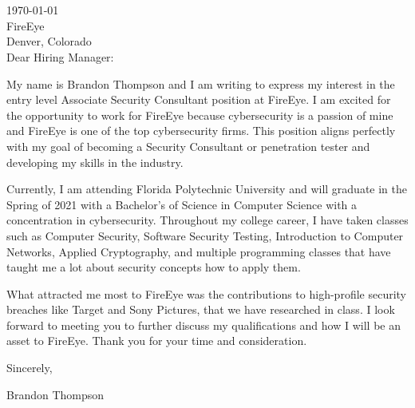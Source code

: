 \documentclass{resume} %
\begin{document}

\begin{rSection}{}
\ \\\
\\
\today \\
FireEye\\
Denver, Colorado\\


Dear Hiring Manager:

My name is Brandon Thompson and I am writing to express my interest in the entry level Associate Security Consultant position at FireEye.
I am excited for the opportunity to work for FireEye because cybersecurity is a passion of mine and FireEye is one of the top cybersecurity firms.
This position aligns perfectly with my goal of becoming a Security Consultant or penetration tester and developing my skills in the industry.

Currently, I am attending Florida Polytechnic University and will graduate in the Spring of 2021 with a Bachelor's of Science in Computer Science with a concentration in cybersecurity.
Throughout my college career, I have taken classes such as Computer Security, Software Security Testing, Introduction to Computer Networks, Applied Cryptography, and multiple programming classes that have taught me a lot about security concepts how to apply them.

What attracted me most to FireEye was the contributions to high-profile security breaches like Target and Sony Pictures, that we have researched in class.
I look forward to meeting you to further discuss my qualifications and how I will be an asset to FireEye.
Thank you for your time and consideration.


Sincerely,

Brandon Thompson


\end{rSection}
\end{document}
